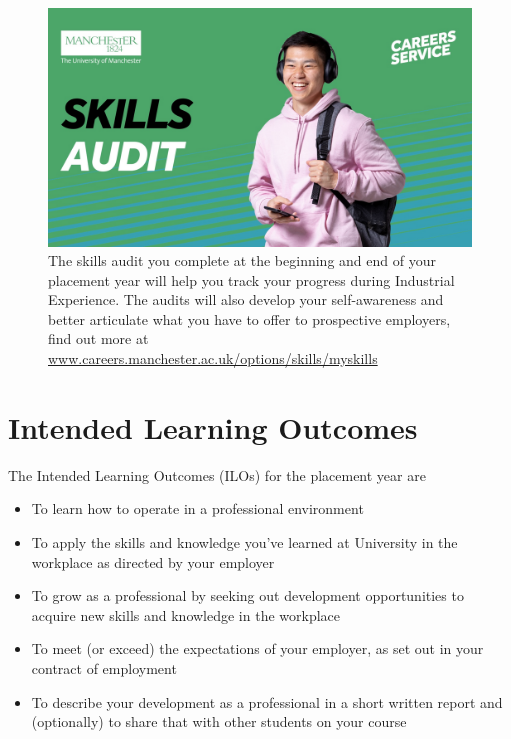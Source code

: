 \documentclass[
]{book}
\providecommand{\tightlist}{%
  \setlength{\itemsep}{0pt}\setlength{\parskip}{0pt}}
\begin{document}
\begin{figure}

{\centering \includegraphics[width=1\linewidth]{images/skills-audit-graphic} 

}

\caption{The skills audit you complete at the beginning and end of your placement year will help you track your progress during Industrial Experience. The audits will also develop your self-awareness and better articulate what you have to offer to prospective employers, find out more at \href{https://www.careers.manchester.ac.uk/options/skills/myskills/}{www.careers.manchester.ac.uk/options/skills/myskills} \citep{audit}}\label{fig:skillsaudit-fig}
\end{figure}



\section{Intended Learning Outcomes}\label{ilos}

The Intended Learning Outcomes (ILOs) for the placement year are

\begin{itemize}
\tightlist
\item
  To learn how to operate in a professional environment
\item
  To apply the skills and knowledge you've learned at University in the workplace as directed by your employer
\item
  To grow as a professional by seeking out development opportunities to acquire new skills and knowledge in the workplace
\item
  To meet (or exceed) the expectations of your employer, as set out in your contract of employment
\item
  To describe your development as a professional in a short written report and (optionally) to share that with other students on your course
\end{itemize}
\end{document}
